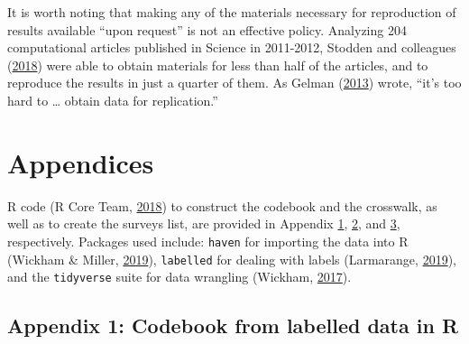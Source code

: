 \documentclass[12pt,]{article}
\begin{document}
It is worth noting that making any of the materials necessary for reproduction of results available ``upon request'' is not an effective policy. Analyzing 204 computational articles published in Science in 2011-2012, Stodden and colleagues (\protect\hyperlink{ref-Stodden2018}{2018}) were able to obtain materials for less than half of the articles, and to reproduce the results in just a quarter of them. As Gelman (\protect\hyperlink{ref-Gelman2013}{2013}) wrote, ``it's too hard to \ldots{} obtain data for replication.''

\clearpage

\hypertarget{appendices}{%
\section{Appendices}\label{appendices}}

R code (R Core Team, \protect\hyperlink{ref-baser}{2018}) to construct the codebook and the crosswalk, as well as to create the surveys list, are provided in Appendix \protect\hyperlink{appendix1}{1}, \protect\hyperlink{appendix2}{2}, and \protect\hyperlink{appendix3}{3}, respectively. Packages used include: \texttt{haven} for importing the data into R (Wickham \& Miller, \protect\hyperlink{ref-haven}{2019}), \texttt{labelled} for dealing with labels (Larmarange, \protect\hyperlink{ref-labelled}{2019}), and the \texttt{tidyverse} suite for data wrangling (Wickham, \protect\hyperlink{ref-tidyverse}{2017}).

\hypertarget{appendix1}{%
\subsection{Appendix 1: Codebook from labelled data in R}\label{appendix1}}

\scriptsize
\end{document}
